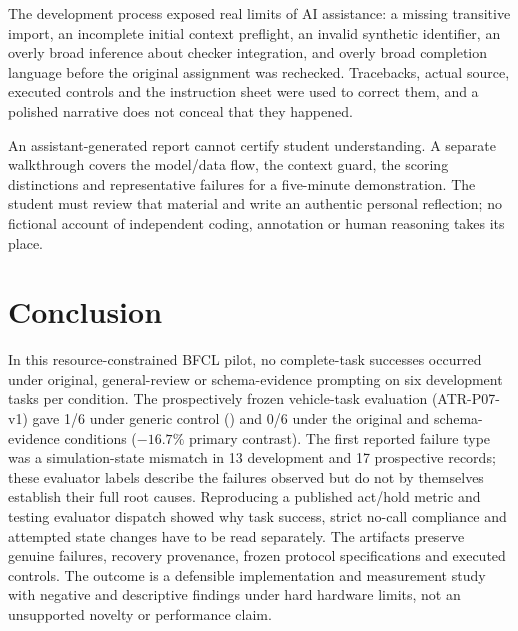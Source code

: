\documentclass[conference]{IEEEtran}
\newcommand{\code}[1]{\texttt{\detokenize{#1}}}
\begin{document}
The development process exposed real limits of AI assistance: a missing transitive import, an incomplete initial context preflight, an invalid synthetic identifier, an overly broad inference about checker integration, and overly broad completion language before the original assignment was rechecked. Tracebacks, actual source, executed controls and the instruction sheet were used to correct them, and a polished narrative does not conceal that they happened.

An assistant-generated report cannot certify student understanding. A separate walkthrough covers the model/data flow, the context guard, the scoring distinctions and representative failures for a five-minute demonstration. The student must review that material and write an authentic personal reflection; no fictional account of independent coding, annotation or human reasoning takes its place.

\section{Conclusion}
In this resource-constrained BFCL pilot, no complete-task successes occurred under original, general-review or schema-evidence prompting on six development tasks per condition. The prospectively frozen vehicle-task evaluation (ATR-P07-v1) gave 1/6 under generic control (\code{multi_turn_miss_func_73}) and 0/6 under the original and schema-evidence conditions ($-16.7\%$ primary contrast). The first reported failure type was a simulation-state mismatch in 13 development and 17 prospective records; these evaluator labels describe the failures observed but do not by themselves establish their full root causes. Reproducing a published act/hold metric and testing evaluator dispatch showed why task success, strict no-call compliance and attempted state changes have to be read separately. The artifacts preserve genuine failures, recovery provenance, frozen protocol specifications and executed controls. The outcome is a defensible implementation and measurement study with negative and descriptive findings under hard hardware limits, not an unsupported novelty or performance claim.

\balance


\end{document}
